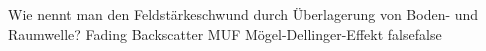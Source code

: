     {Wie nennt man den Feldstärkeschwund durch Überlagerung von Boden- und Raumwelle?}
    {Fading}
    {Backscatter}
    {MUF}
    {Mögel-Dellinger-Effekt}
    {false}{false}